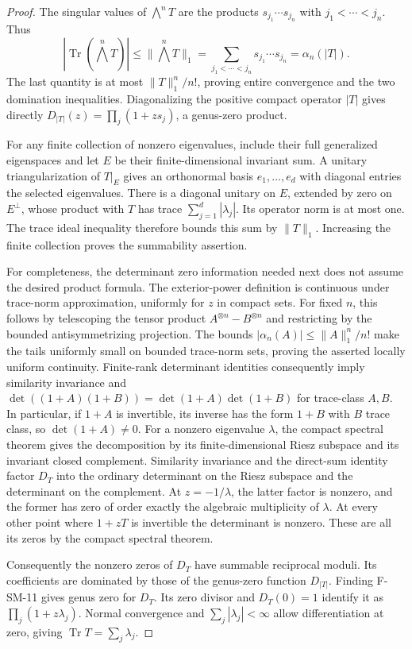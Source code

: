 \documentclass[11pt,a4paper]{article}
\theoremstyle{definition}\newtheorem{definition}[theorem]{Definition}
\theoremstyle{remark}\newtheorem{remark}[theorem]{Remark}
\begin{document}
\begin{proof}
The singular values of $\bigwedge^nT$ are the products
$s_{j_1}\cdots s_{j_n}$ with $j_1<\cdots<j_n$.  Thus
\[
 |\operatorname{Tr}(\bigwedge^nT)|
 \leq\|\bigwedge^nT\|_1
 =\sum_{j_1<\cdots<j_n}s_{j_1}\cdots s_{j_n}
 =\alpha_n(|T|).
\]
The last quantity is at most $\|T\|_1^n/n!$, proving entire convergence
and the two domination inequalities.  Diagonalizing the positive compact
operator $|T|$ gives directly
$D_{|T|}(z)=\prod_j(1+zs_j)$, a genus-zero product.

For any finite collection of nonzero eigenvalues, include their full
generalized eigenspaces and let $E$ be their finite-dimensional invariant
sum.  A unitary triangularization of $T|_E$ gives an orthonormal basis
$e_1,\ldots,e_d$ with diagonal entries the selected eigenvalues.  There is
a diagonal unitary on $E$, extended by zero on $E^\perp$, whose product
with $T$ has trace $\sum_{j=1}^d|\lambda_j|$.  Its operator norm is at
most one.  The trace ideal inequality therefore bounds this sum by
$\|T\|_1$.  Increasing the finite collection proves the summability
assertion.

For completeness, the determinant zero information needed next does not
assume the desired product formula.  The exterior-power definition is
continuous under trace-norm approximation, uniformly for $z$ in compact
sets.  For fixed $n$, this follows by telescoping the tensor product
$A^{\otimes n}-B^{\otimes n}$ and restricting by the bounded
antisymmetrizing projection.  The bounds
$|\alpha_n(A)|\leq\|A\|_1^n/n!$ make the tails uniformly small on
bounded trace-norm sets, proving the asserted locally uniform continuity.
Finite-rank determinant identities consequently imply similarity
invariance and
$\det((1+A)(1+B))=\det(1+A)\det(1+B)$ for trace-class $A,B$.
In particular, if $1+A$ is invertible, its inverse has the form $1+B$
with $B$ trace class, so $\det(1+A)\ne0$.
For a nonzero eigenvalue $\lambda$, the compact spectral theorem gives
the decomposition by its finite-dimensional Riesz subspace and its
invariant closed complement.  Similarity invariance and the direct-sum
identity factor $D_T$ into the ordinary determinant on the Riesz subspace
and the determinant on the complement.  At $z=-1/\lambda$, the latter
factor is nonzero, and the former has zero of order exactly the algebraic
multiplicity of $\lambda$.  At every other point where $1+zT$ is
invertible the determinant is nonzero.  These are all its zeros by the
compact spectral theorem.

Consequently the nonzero zeros of $D_T$ have summable reciprocal moduli.
Its coefficients are dominated by those of the genus-zero function
$D_{|T|}$.  Finding F-SM-11 gives genus zero for $D_T$.  Its zero divisor
and $D_T(0)=1$ identify it as $\prod_j(1+z\lambda_j)$.  Normal convergence
and $\sum_j|\lambda_j|<\infty$ allow differentiation at zero, giving
$\operatorname{Tr}T=\sum_j\lambda_j$.
\end{proof}
\end{document}
